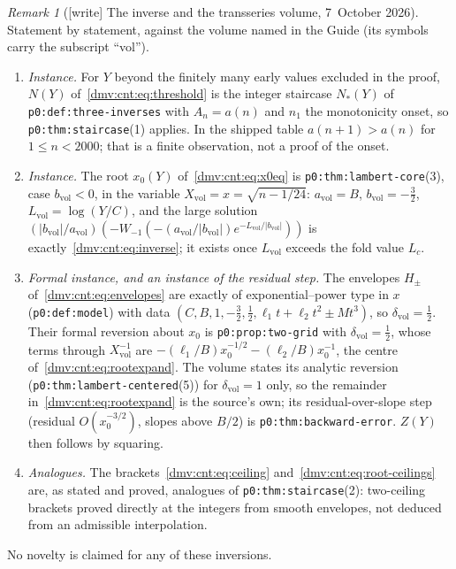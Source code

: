 \documentclass[11pt,letterpaper]{article}
\numberwithin{equation}{section}
\theoremstyle{definition}\newtheorem{definition}[theorem]{Definition}
\theoremstyle{remark}\newtheorem{remark}[theorem]{Remark}
\newcommand{\file}[1]{\nolinkurl{#1}}
\newcommand{\vol}{\mathrm{vol}}
\begin{document}
\begin{remark}[{[write]} The inverse and the transseries volume, 7~October 2026]\label{dmv:cnt:rem:transseries}
Statement by statement, against the volume named in the Guide (its symbols
carry the subscript ``vol'').
\begin{enumerate}[label=(\alph*),leftmargin=*]
\item \emph{Instance.} For $Y$ beyond the finitely many early values
excluded in the proof, $N(Y)$ of~\eqref{dmv:cnt:eq:threshold} is the integer
staircase $N_*(Y)$ of \file{p0:def:three-inverses} with $A_n=a(n)$ and
$n_1$ the monotonicity onset, so \file{p0:thm:staircase}(1) applies. In the
shipped table $a(n+1)>a(n)$ for $1\le n<2000$; that is a finite observation,
not a proof of the onset.
\item \emph{Instance.} The root $x_0(Y)$ of~\eqref{dmv:cnt:eq:x0eq} is
\file{p0:thm:lambert-core}(3), case $b_\vol<0$, in the variable
$X_\vol=x=\sqrt{n-1/24}$: $a_\vol=B$, $b_\vol=-\tfrac32$,
$L_\vol=\log(Y/C)$, and the large solution
$(|b_\vol|/a_\vol)(-W_{-1}(-(a_\vol/|b_\vol|)e^{-L_\vol/|b_\vol|}))$ is
exactly~\eqref{dmv:cnt:eq:inverse}; it exists once $L_\vol$ exceeds the fold
value $L_c$.
\item \emph{Formal instance, and an instance of the residual step.} The
envelopes $H_\pm$ of~\eqref{dmv:cnt:eq:envelopes} are exactly of
exponential--power type in $x$ (\file{p0:def:model}) with data
$(C,B,1,-\tfrac32,\tfrac12,\ell_1t+\ell_2t^2\pm Mt^3)$, so $\delta_\vol=\tfrac12$.
Their formal reversion about $x_0$ is \file{p0:prop:two-grid} with
$\delta_\vol=\tfrac12$, whose terms through $X_\vol^{-1}$ are
$-(\ell_1/B)x_0^{-1/2}-(\ell_2/B)x_0^{-1}$, the centre
of~\eqref{dmv:cnt:eq:rootexpand}. The volume states its analytic reversion
(\file{p0:thm:lambert-centered}(5)) for $\delta_\vol=1$ only, so the
remainder in~\eqref{dmv:cnt:eq:rootexpand} is the source's own; its
residual-over-slope step (residual $O(x_0^{-3/2})$, slopes above $B/2$) is
\file{p0:thm:backward-error}. $Z(Y)$ then follows by squaring.
\item \emph{Analogues.} The brackets~\eqref{dmv:cnt:eq:ceiling}
and~\eqref{dmv:cnt:eq:root-ceilings} are, as stated and proved, analogues of
\file{p0:thm:staircase}(2): two-ceiling brackets proved directly at the
integers from smooth envelopes, not deduced from an admissible interpolation.
\end{enumerate}
No novelty is claimed for any of these inversions.
\end{remark}
\end{document}
